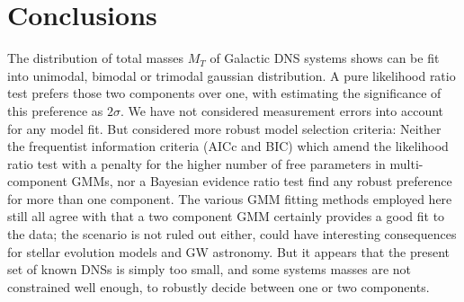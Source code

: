 \documentclass[journal,12pt,twocolumn]{IEEEtran}
\begin{document}
\section{Conclusions}
The distribution of total masses $M_T$ of Galactic DNS systems shows can be fit into unimodal, bimodal or trimodal gaussian distribution. A pure likelihood ratio test prefers those two components over one, with estimating the significance of this preference as $2\sigma$. We have not considered measurement errors into account for any model fit. But considered more robust model selection criteria: Neither the frequentist information criteria (AICc and BIC) which amend the likelihood ratio test with a penalty for the higher number of free parameters in multi-component GMMs, nor a Bayesian evidence ratio test find any robust preference for more than one component. The various GMM fitting methods employed here still all agree with that a two component GMM certainly provides a good fit to the data; the scenario is not ruled out either, could have interesting consequences for stellar evolution models and GW astronomy. But it appears that the present set of known DNSs is simply too small, and some systems masses are not constrained well enough, to robustly decide between one or two components.
\end{document}
